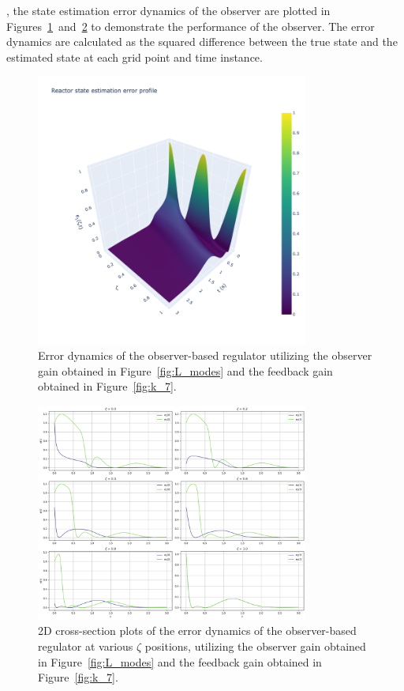 \DIFdelbegin {}\DIFdelend \DIFaddbegin {}\DIFaddend , the state estimation error dynamics of the observer are plotted in Figures~\ref{fig:3D_e1_L_k7}~and~\ref{fig:2D_et_L_k7} to demonstrate the performance of the observer. The error dynamics are calculated as the squared difference between the true state and the estimated state at each grid point and time instance.

\begin{figure}[!htbp]
    \centering
    \includegraphics[width=0.8\textwidth,trim=0 0 100 0,clip]{Figures/3D_e1_L_k7.png}
    \caption{Error dynamics of the observer-based regulator utilizing the observer gain obtained in Figure~\ref{fig:L_modes} and the feedback gain obtained in Figure~\ref{fig:k_7}.}
    \label{fig:3D_e1_L_k7}
\end{figure}

\begin{figure}[!htbp]
    \centering
    \includegraphics[width=0.8\textwidth]{Figures/2D_et_L_k7.png}
    \caption{2D cross-section plots of the error dynamics of the observer-based regulator at various $\zeta$ positions, utilizing the observer gain obtained in Figure~\ref{fig:L_modes} and the feedback gain obtained in Figure~\ref{fig:k_7}.}
    \label{fig:2D_et_L_k7}
\end{figure}

